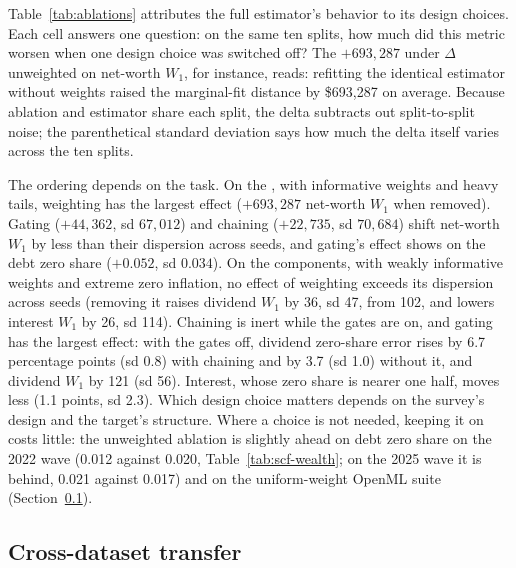 Table~\ref{tab:ablations} attributes the full estimator's behavior to its
design choices. Each cell answers one question: on the same ten splits, how
much did this metric worsen when one design choice was switched off? The
$+693{,}287$ under $\Delta$ unweighted on net-worth $W_1$, for instance,
reads: refitting the identical estimator without weights raised the
marginal-fit distance by \$693,287 on average. Because ablation and
estimator share each split, the delta subtracts out split-to-split noise;
the parenthetical standard deviation says how much the delta itself varies
across the ten splits.

The ordering depends on the task. On the \scf{}, with informative weights
and heavy tails, weighting has the largest effect ($+693{,}287$
net-worth $W_1$ when removed). Gating ($+44{,}362$, sd $67{,}012$) and
chaining ($+22{,}735$, sd $70{,}684$) shift net-worth $W_1$ by less than
their dispersion across seeds, and gating's effect shows on the debt
zero share ($+0.052$, sd $0.034$). On the \cps{} components, with weakly
informative weights and extreme zero inflation, no effect of weighting
exceeds its dispersion across seeds (removing it raises dividend $W_1$ by
36, sd 47, from 102, and lowers interest $W_1$ by 26, sd 114). Chaining is
inert while the gates are on, and gating has the largest effect: with the
gates off, dividend zero-share error rises by 6.7 percentage
points (sd 0.8) with chaining and by 3.7 (sd 1.0) without it, and dividend
$W_1$ by 121 (sd 56). Interest, whose zero share
is nearer one half, moves less (1.1 points, sd 2.3). Which design choice
matters depends on the survey's design and the target's structure. Where a
choice is not needed, keeping it on costs little: the unweighted ablation is slightly ahead on \scf{} debt zero share
on the 2022 wave (0.012 against 0.020, Table~\ref{tab:scf-wealth}; on the
2025 wave it is behind, 0.021 against 0.017) and on the uniform-weight
OpenML suite (Section~\ref{sec:results-openml}).

\subsection{Cross-dataset transfer}
\label{sec:results-openml}


